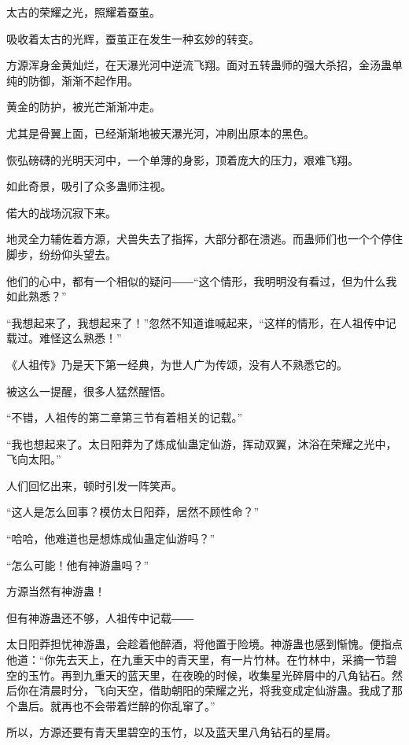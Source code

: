 
\begin{this_body}

太古的荣耀之光，照耀着蚕茧。

吸收着太古的光辉，蚕茧正在发生一种玄妙的转变。

方源浑身金黄灿烂，在天瀑光河中逆流飞翔。面对五转蛊师的强大杀招，金汤蛊单纯的防御，渐渐不起作用。

黄金的防护，被光芒渐渐冲走。

尤其是骨翼上面，已经渐渐地被天瀑光河，冲刷出原本的黑色。

恢弘磅礴的光明天河中，一个单薄的身影，顶着庞大的压力，艰难飞翔。

如此奇景，吸引了众多蛊师注视。

偌大的战场沉寂下来。

地灵全力辅佐着方源，犬兽失去了指挥，大部分都在溃逃。而蛊师们也一个个停住脚步，纷纷仰头望去。

他们的心中，都有一个相似的疑问――“这个情形，我明明没有看过，但为什么我如此熟悉？”

“我想起来了，我想起来了！”忽然不知道谁喊起来，“这样的情形，在人祖传中记载过。难怪这么熟悉！”

《人祖传》乃是天下第一经典，为世人广为传颂，没有人不熟悉它的。

被这么一提醒，很多人猛然醒悟。

“不错，人祖传的第二章第三节有着相关的记载。”

“我也想起来了。太日阳莽为了炼成仙蛊定仙游，挥动双翼，沐浴在荣耀之光中，飞向太阳。”

人们回忆出来，顿时引发一阵笑声。

“这人是怎么回事？模仿太日阳莽，居然不顾性命？”

“哈哈，他难道也是想炼成仙蛊定仙游吗？”

“怎么可能！他有神游蛊吗？”

方源当然有神游蛊！

但有神游蛊还不够，人祖传中记载――

太日阳莽担忧神游蛊，会趁着他醉酒，将他置于险境。神游蛊也感到惭愧。便指点他道：“你先去天上，在九重天中的青天里，有一片竹林。在竹林中，采摘一节碧空的玉竹。再到九重天的蓝天里，在夜晚的时候，收集星光碎屑中的八角钻石。然后你在清晨时分，飞向天空，借助朝阳的荣耀之光，将我变成定仙游蛊。我成了那个蛊后。就再也不会带着烂醉的你乱窜了。”

所以，方源还要有青天里碧空的玉竹，以及蓝天里八角钻石的星屑。


\end{this_body}
